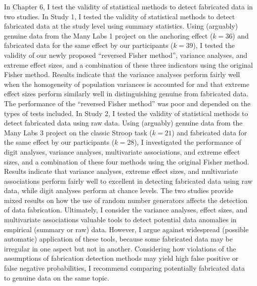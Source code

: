 \documentclass[a5paper]{book}
\begin{document}
In Chapter 6, I test the validity of statistical methods to detect
fabricated data in two studies. In Study 1, I tested the validity of
statistical methods to detect fabricated data at the study level using
summary statistics. Using (arguably) genuine data from the Many Labs 1
project on the anchoring effect (\(k=36\)) and fabricated data for the
same effect by our participants (\(k=39\)), I tested the validity of our
newly proposed \enquote{reversed Fisher method}, variance analyses, and
extreme effect sizes, and a combination of these three indicators using
the original Fisher method. Results indicate that the variance analyses
perform fairly well when the homogeneity of population variances is
accounted for and that extreme effect sizes perform similarly well in
distinguishing genuine from fabricated data. The performance of the
\enquote{reversed Fisher method} was poor and depended on the types of
tests included. In Study 2, I tested the validity of statistical methods
to detect fabricated data using raw data. Using (arguably) genuine data
from the Many Labs 3 project on the classic Stroop task (\(k=21\)) and
fabricated data for the same effect by our participants (\(k=28\)), I
investigated the performance of digit analyses, variance analyses,
multivariate associations, and extreme effect sizes, and a combination
of these four methods using the original Fisher method. Results indicate
that variance analyses, extreme effect sizes, and multivariate
associations perform fairly well to excellent in detecting fabricated
data using raw data, while digit analyses perform at chance levels. The
two studies provide mixed results on how the use of random number
generators affects the detection of data fabrication. Ultimately, I
consider the variance analyses, effect sizes, and multivariate
associations valuable tools to detect potential data anomalies in
empirical (summary or raw) data. However, I argue against widespread
(possible automatic) application of these tools, because some fabricated
data may be irregular in one aspect but not in another. Considering how
violations of the assumptions of fabrication detection methods may yield
high false positive or false negative probabilities, I recommend
comparing potentially fabricated data to genuine data on the same topic.
\end{document}
